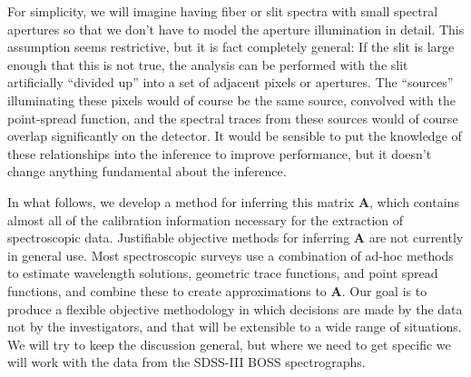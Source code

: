 \documentclass[12pt]{article}
\newcommand{\hmatrix}[1]{\boldsymbol{#1}}
\newcommand{\Amatrix}{\hmatrix{A}}
\begin{document}
For simplicity, we will imagine having fiber or slit spectra with
small spectral apertures so that we don't have to model the aperture
illumination in detail.  This assumption seems restrictive, but it is
fact completely general: If the slit is large enough that this is not
true, the analysis can be performed with the slit artificially
``divided up'' into a set of adjacent pixels or apertures.  The
``sources'' illuminating these pixels would of course be the same
source, convolved with the point-spread function, and the spectral
traces from these sources would of course overlap significantly on the
detector.  It would be sensible to put the knowledge of these
relationships into the inference to improve performance, but it
doesn't change anything fundamental about the inference.

In what follows, we develop a method for inferring this matrix
$\Amatrix$, which contains almost all of the calibration information
necessary for the extraction of spectroscopic data.  Justifiable
objective methods for inferring $\Amatrix$ are not currently in
general use.  Most spectroscopic surveys use a combination of ad-hoc
methods to estimate wavelength solutions, geometric trace functions,
and point spread functions, and combine these to create approximations
to $\Amatrix$.  Our goal is to produce a flexible objective
methodology in which decisions are made by the data not by the
investigators, and that will be extensible to a wide range of
situations.  We will try to keep the discussion general, but where we
need to get specific we will work with the data from the SDSS-III BOSS
spectrographs.
\end{document}
